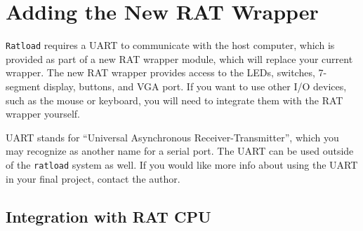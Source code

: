 \documentclass[notitlepage]{article}
\newcommand{\infosign}{\fontencoding{U}\fontfamily{futs}\huge\selectfont\char 116\relax}
\begin{document}
\section{Adding the New RAT Wrapper}
\texttt{Ratload} requires a UART to communicate with the host computer, which is provided as part of a new RAT wrapper module, which will replace your current wrapper. The new RAT wrapper provides access to the LEDs, switches, 7-segment display, buttons, and VGA port. If you want to use other I/O devices, such as the mouse or keyboard, you will need to integrate them with the RAT wrapper yourself.

\begin{infobox}
  {\infosign} UART stands for ``Universal Asynchronous Receiver-Transmitter'', which you may recognize as another name for a serial port. The UART can be used outside of the \texttt{ratload} system as well. If you would like more info about using the UART in your final project, contact the author.
\end{infobox}

\subsection{Integration with RAT CPU}
\end{document}
